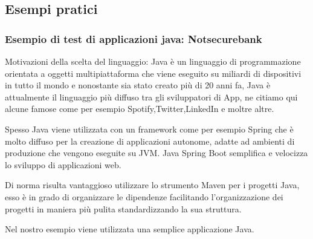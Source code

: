 \subsection{Esempi pratici} 
\subsubsection{Esempio di test di applicazioni java: Notsecurebank}
Motivazioni della scelta del linguaggio: Java è un linguaggio di programmazione orientata a oggetti multipiattaforma che viene eseguito su miliardi di dispositivi in tutto il mondo e nonostante sia stato creato più di 20 anni fa, Java è attualmente il linguaggio più diffuso tra gli sviluppatori di App, ne citiamo qui alcune famose come per esempio Spotify,Twitter,LinkedIn e moltre altre. 

Spesso Java viene utilizzata con un framework come per esempio Spring che è molto diffuso per la creazione di applicazioni autonome, adatte ad ambienti di produzione che vengono eseguite su JVM. Java Spring Boot semplifica e velocizza lo sviluppo di applicazioni web. 

Di norma risulta vantaggioso utilizzare lo strumento Maven per i progetti Java, esso è in grado di organizzare le dipendenze facilitando l’organizzazione dei progetti in maniera più pulita standardizzando la sua struttura.

Nel nostro esempio viene utilizzata una semplice applicazione Java. 

